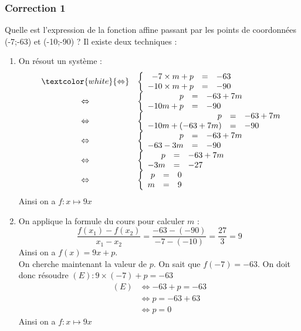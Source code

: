 \documentclass[15pt, mathserif]{beamer}
\begin{document}
\begin{frame}
\vspace{-10mm}
	\frametitle{Correction 1}
\vspace*{1cm} 
 \footnotesize{Quelle est l'expression de la fonction affine passant par les points de coordonnées (-7;-63) et (-10;-90) ? Il existe deux techniques :} 
 \begin{multicols}{2} 
 \begin{enumerate} 
 \item On résout un système : $$ \begin{array}{rcl} 
 & \textcolor{white}{\Leftrightarrow} & 
 \left 
 \{\begin{array}{rcl}-7\times m + p&=&-63 \\ 
 -10\times m+p&=&-90\end{array} \right. \\ 
 &\Leftrightarrow & \left 
 \{\begin{array}{rcl} p&=&-63+7m \\ 
 -10m+p&=&-90\end{array} \right. \\ 
 &\Leftrightarrow & \left 
 \{\begin{array}{rcl} p&=&-63+7m \\ 
 -10m+(-63+7m) &=&-90\end{array} \right. \\ &\Leftrightarrow& \left \{\begin{array}{rcl}p&=&-63+7m \\ 
 -63-3m&=&-90\end{array} \right. \\ &\Leftrightarrow& \left \{\begin{array}{rcl}p&=&-63+7m \\ 
 -3m&=&-27\end{array} \right. \\  &\Leftrightarrow& \left \{\begin{array}{rcl} p&=&0 \\  m&=&9\end{array}\right. \end{array}$$ 
 Ainsi on a $f:x\mapsto 9x$ 
 \columnbreak 
 \item 
 \footnotesize{On applique la formule du cours pour calculer $m$ :$$ \dfrac{f(x_1)-f(x_2)}{x_1-x_2}=\dfrac{-63-\left(-90\right)}{-7-\left(-10\right)}= \dfrac{27}{3}=9$$} \footnotesize{ Ainsi on a $f(x)= 9x +p $. 
  \\ On cherche maintenant la valeur de $p$. On sait que $f(-7)=-63$. On doit donc résoudre $(E): 9\times\left(-7\right)+p=-63$}	 
 \begin{align*} (E)& \Leftrightarrow -63+p=-63\\
		 	 & \Leftrightarrow p=-63+63\\
			 & \Leftrightarrow p=0
	 \end{align*} 
 Ainsi on a $f:x\mapsto 9x$ 
 \end{enumerate} 
 \end{multicols} 
 \end{frame}
\end{document}
